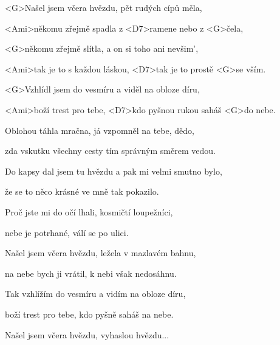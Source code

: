 

\zs
<G>Našel jsem včera hvězdu, pět rudých cípů měla,

<Ami>někomu zřejmě spadla z <D7>ramene nebo z <G>čela,

<G>někomu zřejmě slítla, a on si toho ani nevšim',

<Ami>tak je to s každou láskou, <D7>tak je to prostě <G>se vším.
\ks

\zr
<G>Vzhlídl jsem do vesmíru a viděl na obloze díru,

<Ami>boží trest pro tebe, <D7>kdo pyšnou rukou saháš <G>do nebe.
\kr

\zs
Oblohou táhla mračna, já vzpomněl na tebe, dědo,

zda vskutku všechny cesty tím správným směrem vedou.

Do kapsy dal jsem tu hvězdu a pak mi velmi smutno bylo,

že se to něco krásné ve mně tak pokazilo.
\ks

\zr\kr

\zs
Proč jste mi do očí lhali, kosmičtí loupežníci,

nebe je potrhané, válí se po ulici.

Našel jsem včera hvězdu, ležela v mazlavém bahnu,

na nebe bych ji vrátil, k nebi však nedosáhnu.
\ks

\zr
Tak vzhlížím do vesmíru a vidím na obloze díru,

boží trest pro tebe, kdo pyšně saháš na nebe.
\kr

Našel jsem včera hvězdu, vyhaslou hvězdu...

\kp
